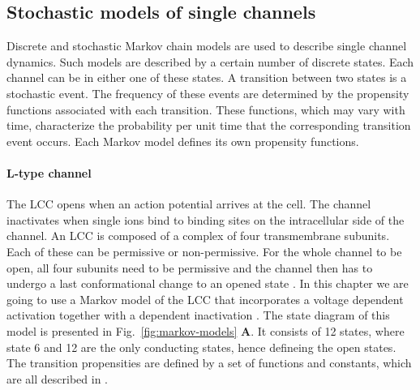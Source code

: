 \subsection*{Stochastic models of single channels}
\label{sec:stochastic-models}
Discrete and stochastic Markov chain models are used to describe single channel dynamics. Such models are described by a certain number of discrete states. Each channel can be in either one of these states. A transition between two states is a stochastic event. The frequency of these events are determined by the propensity functions associated with each transition. These functions, which may vary with time, characterize the probability per unit time that the corresponding transition event occurs. Each Markov model defines its own propensity functions. \par

\paragraph*{L-type \Ca channel}
\label{sec:lcc}
The LCC opens when an action potential arrives at the cell. The channel inactivates when single \Ca ions bind to binding sites on the intracellular side of the channel. An LCC is composed of a complex of four transmembrane subunits. Each of these can be permissive or non-permissive. For the whole channel to be open, all four subunits need to be permissive and the channel then has to undergo a last conformational change to an opened state \cite{Hille2001}. In this chapter we are going to use a Markov model of the LCC that incorporates a voltage dependent activation together with a \Ca dependent inactivation \cite{JafriRiceWinslow1998,Gree_2002_2918}. The state diagram of this model is presented in Fig.~\ref{fig:markov-models} \textbf{A}. It consists of 12 states, where state 6 and 12 are the only conducting states, hence defineing the open states. The transition propensities are defined by a set of functions and constants, which are all described in \citet{GreensteinWinslow2002}.\par

